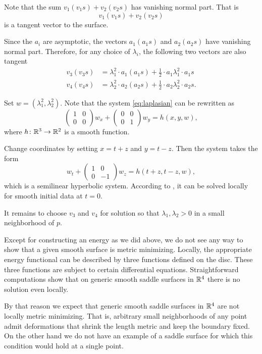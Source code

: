 \documentclass{article}
\begin{document}
Note that the sum $v_1(v_1s)+v_2(v_2s)$ has vanishing normal part.
That is \[v_1(v_1s)+v_2(v_2s)\] is a tangent vector to the surface.

Since the $a_i$ are asymptotic,
the vectors $a_1(a_1s)$ and $a_2(a_2s)$ have vanishing normal part.
Therefore, for any choice of $\lambda_i$,
the following two vectors are also tangent
\begin{align*}
v_3(v_3s)&=\lambda_1^2\cdot a_1(a_1s)+\tfrac12\cdot a_1\lambda_1^2\cdot a_1s
\\
v_4(v_4s)&=\lambda_2^2\cdot a_2(a_2s)+\tfrac12\cdot a_2\lambda_2^2\cdot a_2s.
\end{align*}

Set $w=(\lambda_1^2,\lambda_2^2)$.
Note that the system \ref{eq:laplasian} can be rewritten as 
\[\left(\begin{smallmatrix}
   1&0\\0&0
  \end{smallmatrix}\right)
w_x
+
\left(\begin{smallmatrix}
   0&0\\0&1
  \end{smallmatrix}\right)
w_y=h(x,y,w),\]
where $h\colon\mathbb{R}^3\to\mathbb{R}^2$ is a smooth function.

Change coordinates by setting $x=t+z$ and $y=t-z$.
Then the system takes the form 
\[w_t+\left(\begin{smallmatrix}
   1&0\\0&-1
  \end{smallmatrix}\right)
w_z=h(t+z,t-z,w),\]
which is a semilinear hyperbolic system.
According to \cite[Theorem 3.6]{bressan}, it can be solved locally for smooth initial data at $t=0$.

It remains to choose $v_3$ and $v_4$ for solution so that $\lambda_1, \lambda_2>0$ in a small neighborhood of $p$.
\qeds

Except for constructing an energy as we did above,
we do not see any way to show that a given smooth surface is metric minimizing.
Locally, the appropriate energy functional can be described by three functions defined on the disc.
These three functions are subject to certain differential equations.
Straightforward computations show that on generic smooth saddle surfaces in $\mathbb{R}^4$ 
there is no solution even locally.

By that reason we expect that generic smooth saddle surfaces in $\mathbb{R}^4$ are not locally metric minimizing. 
That is, arbitrary small neighborhoods of any point admit deformations that shrink 
the length metric and keep the boundary fixed.
On the other hand we do not have an example of a saddle surface for which this condition would hold at a single point.
\end{document}

